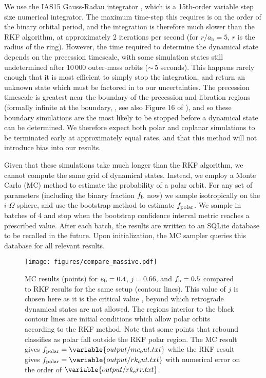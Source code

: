 \documentclass[twocolumn,linenumbers]{aastex631}
\begin{document}
We use the IAS15 Gauss-Radau integrator \citep{reboundias15}, which is a 15th-order variable step size numerical integrator. The maximum time-step this requires is on the order of the binary orbital period, and the integration is therefore much slower than the RKF algorithm, at approximately 2 iterations per second (for $r/a_\text{b}=5$, $r$ is the radius of the ring). However, the time required to determine the dynamical state depends on the precession timescale, with some simulation states still undetermined after $10\,000$ outer-mass orbits ($\sim \,$5 seconds). This happens rarely enough that it is most efficient to simply stop the integration, and return an unknown state which must be factored in to our uncertainties. The precession timescale is greatest near the boundary of the precession and libration regions (formally infinite at the boundary, \citealt{farago2010}, see also Figure 16 of \citealt{rabago2024}), and so these boundary simulations are the most likely to be stopped before a dynamical state can be determined. We therefore expect both polar and coplanar simulations to be terminated early at approximately equal rates, and that this method will not introduce bias into our results.

Given that these simulations take much longer than the RKF algorithm, we cannot compute the same grid of dynamical states. Instead, we employ a Monte Carlo (MC) method to estimate the probability of a polar orbit. For any set of parameters (including the binary fraction $f_{\rm b}$ now) we sample isotropically on the $i$-$\Omega$ sphere, and use the bootstrap method to estimate $f_{\rm polar}$. We sample in batches of 4 and stop when the bootstrap confidence interval metric reaches a prescribed value. After each batch, the results are written to an SQLite database to be recalled in the future. Upon initialization, the MC sampler queries this database for all relevant results.


\begin{figure}
    \begin{centering}
        \texttt{[image: figures/compare\_massive.pdf]}
        \caption{
            MC results (points) for $e_{\rm b}=0.4$, $j=0.66$, and $f_{\rm b}=0.5$ compared to RKF results for the same setup (contour lines). This value of $j$ is chosen here as it is the critical value \citep[see][]{martin2019,abod2022}, beyond which retrograde dynamical states are not allowed. The regions interior to the black contour lines are initial conditions which allow polar orbits according to the RKF method.
            Note that some points that {\sc rebound} classifies as polar fall outside the RKF polar region.
            The MC result gives $f_{\text{polar}} = \variable{output/mc_out.txt}$ while the RKF result gives $f_{\text{polar}} = \variable{output/rk_out.txt}$ with
            numerical error on the order of $\variable{output/rk_err.txt}$.
        }
        \label{fig:rkf}
    \end{centering}
\end{figure}
\end{document}
